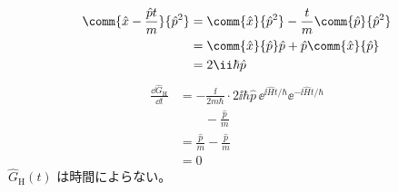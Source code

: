 \begin{align*}
\comm{\hat{x}-\frac{\hat{p}t}{m}}{\hat{p}^{2}}&=\comm{\hat{x}}{\hat{p}^{2}}-\frac{t}{m}\comm{\hat{p}}{\hat{p}^{2}}\\
&=\comm{\hat{x}}{\hat{p}}\hat{p}+\hat{p}\comm{\hat{x}}{\hat{p}}\\
&=2\ii\hbar\hat{p}
\end{align*}
\begin{align*}
\frac{\dd\hat{G}_{\mathrm{H}}}{\dd t}&=-\frac{\ii}{2m\hbar}\cdot2\ii\hbar\hat{p}\,\ee^{\ii\hat{H}t/\hbar}\ee^{-\ii\hat{H}t/\hbar}\\
&\qquad-\frac{\hat{p}}{m}\\
&=\frac{\hat{p}}{m}-\frac{\hat{p}}{m}\\
&=0
\end{align*}
$\hat{G}_{\mathrm{H}}(t)$ は時間によらない。

